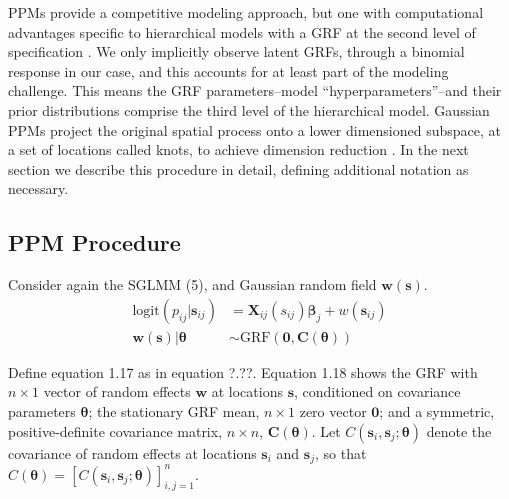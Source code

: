 PPMs provide a competitive modeling approach, but one with computational advantages specific to hierarchical models with a GRF at the second level of specification \citep{Banerjee2008}. We only implicitly observe latent GRFs, through a binomial response in our case, and this accounts for at least part of the modeling challenge. This means the GRF parameters--model ``hyperparameters''--and their prior distributions comprise the third level of the hierarchical model. Gaussian PPMs project the original spatial process onto a lower dimensioned subspace, at a set of locations called knots, to achieve dimension reduction \citep{Banerjee2008}. In the next section we describe this procedure in detail, defining additional notation as necessary.

\subsection{PPM Procedure}

Consider again the SGLMM (5), and Gaussian random field $\pmb{w}(\pmb{s})$.
\begin{align}
\text{logit}(p_{ij}|\pmb{s}_{ij}) &= \pmb{X}_{ij}(s_{ij}) \pmb{\beta}_{j} + w(\pmb{s}_{ij}) \\
\pmb{w}(\pmb{s}) | \pmb{\theta} &\sim \text{GRF}(\pmb{0}, \pmb{C}(\pmb{\theta}))
\end{align}

Define equation 1.17 as in equation ?.??. Equation 1.18 shows the GRF with $n \times 1$ vector of random effects $\pmb{w}$ at locations $\pmb{s}$, conditioned on covariance parameters $\pmb{\theta}$; the stationary GRF mean, $n \times 1$ zero vector $\pmb{0}$; and a symmetric, positive-definite covariance matrix, $n \times n$,  $\pmb{C}(\pmb{\theta})$. Let $C(\pmb{s}_{i}, \pmb{s}_{j}; \pmb{\theta})$ denote the covariance of random effects at locations $\pmb{s}_{i}$ and $\pmb{s}_{j}$, so that $C(\pmb{\theta}) = [C(\pmb{s}_{i}, \pmb{s}_{j}; \pmb{\theta})]_{i,j=1}^{n}$.

